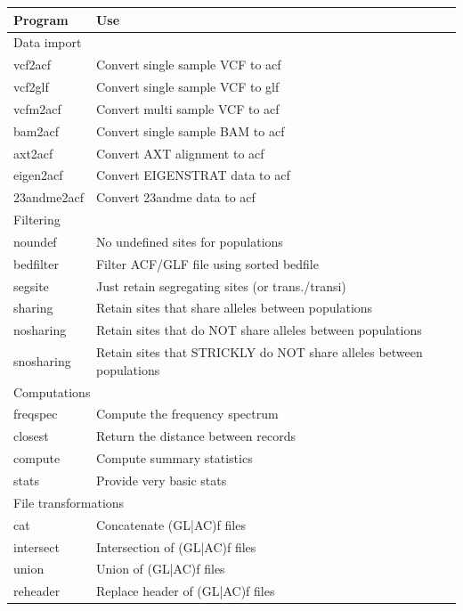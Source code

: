 \documentclass[a4paper]{article}
\begin{document}
\noindent \begin{tabular}{|l|l|}
\hline
Program & Use \\
\hline
\multicolumn{2}{|l|}{Data import} \\
\hline
      vcf2acf     &    Convert single sample VCF to acf  \\
      vcf2glf     &    Convert single sample VCF to glf  \\
      vcfm2acf    &    Convert multi  sample VCF to acf  \\
      bam2acf     &    Convert single sample BAM to acf  \\
      axt2acf     &    Convert AXT alignment to acf  \\
      eigen2acf   &    Convert EIGENSTRAT data to acf \\
      23andme2acf &    Convert 23andme data to acf  \\
\hline
\multicolumn{2}{|l|}{Filtering} \\
\hline
      noundef     &    No undefined sites for populations \\
      bedfilter   &    Filter ACF/GLF file using sorted bedfile \\
      segsite     &    Just retain segregating sites (or trans./transi) \\
      sharing     &    Retain sites that share alleles between populations \\
      nosharing   &    Retain sites that do NOT share alleles between populations \\
      snosharing  &    Retain sites that STRICKLY do NOT share alleles between populations \\
\hline
\multicolumn{2}{|l|}{Computations} \\
\hline
      freqspec    &    Compute the frequency spectrum \\
      closest     &    Return the distance between records \\
      compute     &    Compute summary statistics \\
      stats       &    Provide very basic stats \\
\hline
\multicolumn{2}{|l|}{File transformations} \\
\hline
      cat         &    Concatenate (GL|AC)f files \\
      intersect   &    Intersection of (GL|AC)f files \\
      union       &    Union of (GL|AC)f files \\
      reheader    &    Replace header of (GL|AC)f files \\

\end{tabular}
\end{document}

